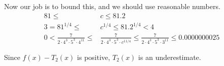 \begin{frame}[t]{}
\begin{QuestionSet}
{Now our job is to bound this, and we should use reasonable numbers.
\begin{align*}
81 \leq &c \leq 81.2\\
3=81^{1/4} \leq &c^{1/4} \leq 81.2^{1/4}<4\\
0<\frac{7}{2\cdot4^3\cdot5^3\cdot 4^{11}}
        \leq &\frac{7}{2\cdot4^3\cdot5^3\cdot c^{11/4}}
         \leq\frac{7}{2\cdot4^3\cdot5^3\cdot 3^{11}}
    \le 0.0000000025
\end{align*}

Since $f(x)-T_2(x)$ is positive, $T_2(x)$ is an underestimate.
}
\end{QuestionSet}
\end{frame}



